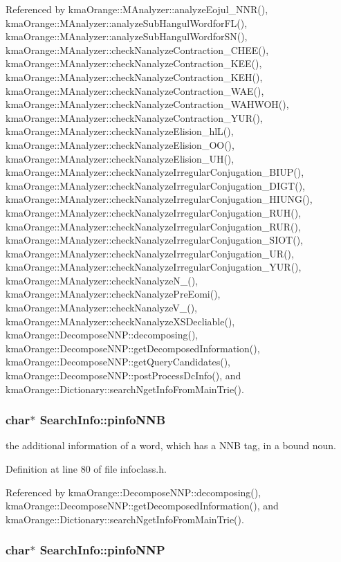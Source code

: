Referenced by kmaOrange::MAnalyzer::analyzeEojul\_\-NNR(), kmaOrange::MAnalyzer::analyzeSubHangulWordforFL(), kmaOrange::MAnalyzer::analyzeSubHangulWordforSN(), kmaOrange::MAnalyzer::checkNanalyzeContraction\_\-CHEE(), kmaOrange::MAnalyzer::checkNanalyzeContraction\_\-KEE(), kmaOrange::MAnalyzer::checkNanalyzeContraction\_\-KEH(), kmaOrange::MAnalyzer::checkNanalyzeContraction\_\-WAE(), kmaOrange::MAnalyzer::checkNanalyzeContraction\_\-WAHWOH(), kmaOrange::MAnalyzer::checkNanalyzeContraction\_\-YUR(), kmaOrange::MAnalyzer::checkNanalyzeElision\_\-hlL(), kmaOrange::MAnalyzer::checkNanalyzeElision\_\-OO(), kmaOrange::MAnalyzer::checkNanalyzeElision\_\-UH(), kmaOrange::MAnalyzer::checkNanalyzeIrregularConjugation\_\-BIUP(), kmaOrange::MAnalyzer::checkNanalyzeIrregularConjugation\_\-DIGT(), kmaOrange::MAnalyzer::checkNanalyzeIrregularConjugation\_\-HIUNG(), kmaOrange::MAnalyzer::checkNanalyzeIrregularConjugation\_\-RUH(), kmaOrange::MAnalyzer::checkNanalyzeIrregularConjugation\_\-RUR(), kmaOrange::MAnalyzer::checkNanalyzeIrregularConjugation\_\-SIOT(), kmaOrange::MAnalyzer::checkNanalyzeIrregularConjugation\_\-UR(), kmaOrange::MAnalyzer::checkNanalyzeIrregularConjugation\_\-YUR(), kmaOrange::MAnalyzer::checkNanalyzeN\_\-(), kmaOrange::MAnalyzer::checkNanalyzePreEomi(), kmaOrange::MAnalyzer::checkNanalyzeV\_\-(), kmaOrange::MAnalyzer::checkNanalyzeXSDecliable(), kmaOrange::DecomposeNNP::decomposing(), kmaOrange::DecomposeNNP::getDecomposedInformation(), kmaOrange::DecomposeNNP::getQueryCandidates(), kmaOrange::DecomposeNNP::postProcessDcInfo(), and kmaOrange::Dictionary::searchNgetInfoFromMainTrie().\hypertarget{classSearchInfo_194202f3304000bdb1caa7a1d5c221d2}{
\subsubsection[{pinfoNNB}]{\setlength{\rightskip}{0pt plus 5cm}char$\ast$ {\bf SearchInfo::pinfoNNB}}}
\label{classSearchInfo_194202f3304000bdb1caa7a1d5c221d2}


the additional information of a word, which has a NNB tag, in a bound noun. 



Definition at line 80 of file infoclass.h.

Referenced by kmaOrange::DecomposeNNP::decomposing(), kmaOrange::DecomposeNNP::getDecomposedInformation(), and kmaOrange::Dictionary::searchNgetInfoFromMainTrie().\hypertarget{classSearchInfo_3ca4a80c815323c4ab3e372f2bc14d32}{
\subsubsection[{pinfoNNP}]{\setlength{\rightskip}{0pt plus 5cm}char$\ast$ {\bf SearchInfo::pinfoNNP}}}
\label{classSearchInfo_3ca4a80c815323c4ab3e372f2bc14d32}


